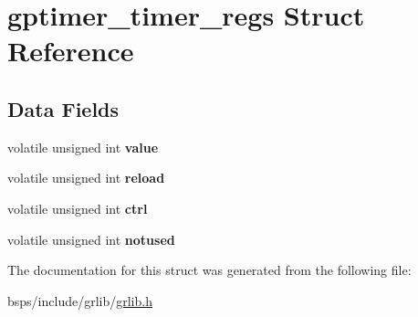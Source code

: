 \hypertarget{structgptimer__timer__regs}{}\section{gptimer\+\_\+timer\+\_\+regs Struct Reference}
\label{structgptimer__timer__regs}
\subsection*{Data Fields}
\begin{DoxyCompactItemize}
\item 
\mbox{\label{structgptimer__timer__regs_aace06188164153ce84e37fb96bcc3402}} 
volatile unsigned int {\bfseries value}
\item 
\mbox{\label{structgptimer__timer__regs_ae8279bdf6530a3ea1cbd20eebb9de1a4}} 
volatile unsigned int {\bfseries reload}
\item 
\mbox{\label{structgptimer__timer__regs_a711ee4afdf143c7dd55ce59b644b58ee}} 
volatile unsigned int {\bfseries ctrl}
\item 
\mbox{\label{structgptimer__timer__regs_ad04388d944079d5a8c550d41990d23d1}} 
volatile unsigned int {\bfseries notused}
\end{DoxyCompactItemize}


The documentation for this struct was generated from the following file\+:\begin{DoxyCompactItemize}
\item 
bsps/include/grlib/\mbox{\hyperlink{grlib_8h}{grlib.\+h}}\end{DoxyCompactItemize}
